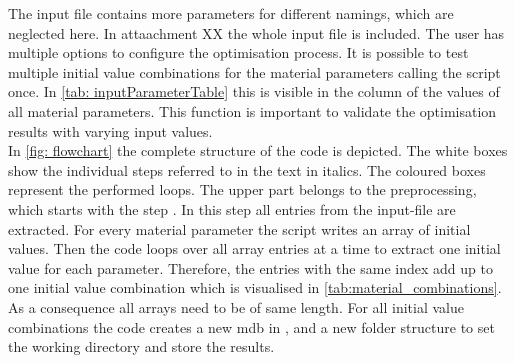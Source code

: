 The input file contains more parameters for different namings, which are neglected here. In attaachment XX the whole input file is included. 
The user has multiple options to configure the optimisation process. It is possible to test multiple initial value combinations for the material parameters calling the script once. In \autoref{tab: inputParameterTable} this is visible in the column  of the values of all material parameters. This function is important to validate the optimisation results with varying input values. \\
\indent In \autoref{fig: flowchart} the complete structure of the code is depicted. The white boxes show the individual steps referred to in the text in italics. The coloured boxes represent the performed loops. 
The upper part belongs to the preprocessing, which starts with the step .
In this step all entries from the input-file are extracted. 
For every material parameter the script writes an array of initial values. Then the code loops over all array entries at a time to extract one initial value for each parameter. Therefore, the entries with the same index add up to one initial value combination which is visualised in \autoref{tab:material_combinations}. As a consequence all arrays need to be of same length. For all initial value combinations the code creates a new \acrfull{mdb} in , and a new folder structure to set the working directory and store the results.




